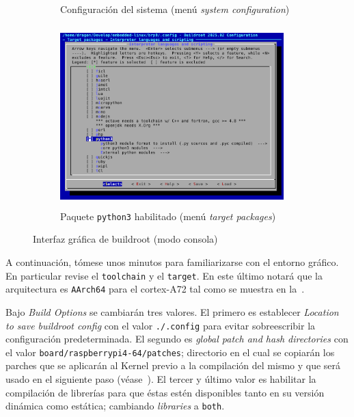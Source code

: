 \begin{figure}[H]
\begin{subfigure}[b]{0.5\textwidth}
		\caption{Configuración del sistema (menú \emph{system configuration})}%
		\label{fig:mc-sysconfig}
	\end{subfigure}%
	\begin{subfigure}[b]{0.5\textwidth}
		\centering
		\includegraphics[width=0.95\textwidth,height=7cm,keepaspectratio]{img/make-mc-python3.png}
		\caption{Paquete \texttt{python3} habilitado (menú \emph{target packages})}%
		\label{fig:mc-python3}
	\end{subfigure}
	\caption{Interfaz gráfica de buildroot (modo consola)}%
	\label{fig:make-menuconfig}
\end{figure}

A continuación, tómese unos minutos para familiarizarse con el entorno gráfico.
En particular revise el \texttt{toolchain} y el \texttt{target}.
En este último notará que la arquitectura es \texttt{AArch64} para el cortex-A72
tal como se muestra en la~.

Bajo \emph{Build Options} se cambiarán tres valores.
El primero es establecer \emph{Location to save buildroot config} con el valor \texttt{./.config} para evitar sobreescribir la configuración predeterminada.
El segundo es \emph{global patch and hash directories} con el valor \texttt{board/raspberrypi4-64/patches}; directorio en el cual se copiarán los parches que se aplicarán al Kernel previo a la compilación del mismo y que será usado en el siguiente paso (véase~).
El tercer y último valor es habilitar la compilación de librerías para que éstas estén disponibles tanto en su versión dinámica como estática; cambiando \emph{libraries} a \texttt{both}.

